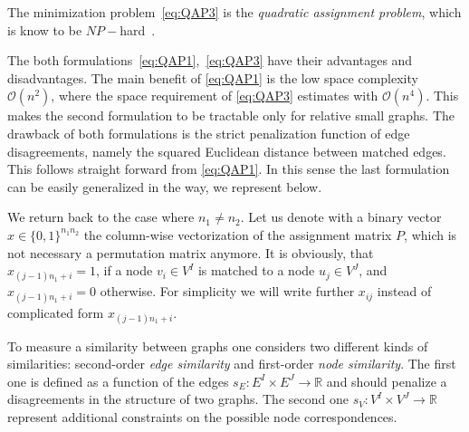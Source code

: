 The minimization problem~\eqref{eq:QAP3} is the \emph{quadratic assignment problem}, which is know to be $NP-$hard~\cite{Burkard98thequadratic,Sahni1974}.

The both formulations~\eqref{eq:QAP1},~\eqref{eq:QAP3} have their advantages and disadvantages. The main benefit of \eqref{eq:QAP1} is the low space complexity $\mathcal O(n^2)$, where the space requirement of \eqref{eq:QAP3} estimates with $\mathcal O(n^4)$. This makes the second formulation to be tractable only for relative small graphs. The drawback of both formulations is the strict penalization function of edge disagreements, namely the squared Euclidean distance between matched edges. This follows straight forward from \eqref{eq:QAP1}. In this sense the last formulation can be easily generalized in the way, we represent below. 

We return back to the case where $n_1\not=n_2$. Let us denote with a binary vector $x\in \{0,1\}^{n_1n_2}$ the column-wise vectorization of the assignment matrix $P$, which is not necessary a permutation matrix anymore. It is obviously, that $x_{(j-1)n_1+i}=1$, if a node $v_i\in V^I$ is matched to a node $u_j\in V^J$, and $x_{(j-1)n_1+i}=0$ otherwise. For simplicity we will write further $x_{ij}$ instead of complicated form $x_{(j-1)n_1+i}$.
 

To measure a similarity between graphs one considers two different kinds of similarities: second-order \emph{edge similarity} and first-order \emph{node similarity}. The first one is defined as a function of the edges $s_E:E^I\times E^J\rightarrow\mathbb{R}$ and should penalize a disagreements in the structure of two graphs. The second one $s_V:V^I\times V^J\rightarrow\mathbb{R}$ represent additional constraints on the possible node correspondences.


